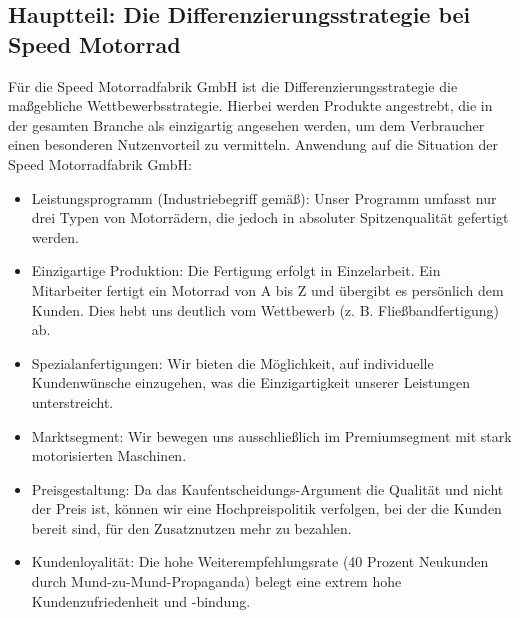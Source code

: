 \documentclass[12pt, a4paper]{article}
\begin{document}
\subsection{Hauptteil: Die Differenzierungsstrategie bei Speed Motorrad}
Für die Speed Motorradfabrik GmbH ist die Differenzierungsstrategie die maßgebliche Wettbewerbsstrategie. Hierbei werden Produkte angestrebt, die in der gesamten Branche als einzigartig angesehen werden, um dem Verbraucher einen besonderen Nutzenvorteil zu vermitteln.
Anwendung auf die Situation der Speed Motorradfabrik GmbH:
\begin{itemize}
    \item Leistungsprogramm (Industriebegriff gemäß): Unser Programm umfasst nur drei Typen von Motorrädern, die jedoch in absoluter Spitzenqualität gefertigt werden.
    \item Einzigartige Produktion: Die Fertigung erfolgt in Einzelarbeit. Ein Mitarbeiter fertigt ein Motorrad von A bis Z und übergibt es persönlich dem Kunden. Dies hebt uns deutlich vom Wettbewerb (z. B. Fließbandfertigung) ab.
    \item Spezialanfertigungen: Wir bieten die Möglichkeit, auf individuelle Kundenwünsche einzugehen, was die Einzigartigkeit unserer Leistungen unterstreicht.
    \item Marktsegment: Wir bewegen uns ausschließlich im Premiumsegment mit stark motorisierten Maschinen.
    \item Preisgestaltung: Da das Kaufentscheidungs-Argument die Qualität und nicht der Preis ist, können wir eine Hochpreispolitik verfolgen, bei der die Kunden bereit sind, für den Zusatznutzen mehr zu bezahlen.
    \item Kundenloyalität: Die hohe Weiterempfehlungsrate (40 Prozent Neukunden durch Mund-zu-Mund-Propaganda) belegt eine extrem hohe Kundenzufriedenheit und -bindung.
\end{itemize}
\end{document}
